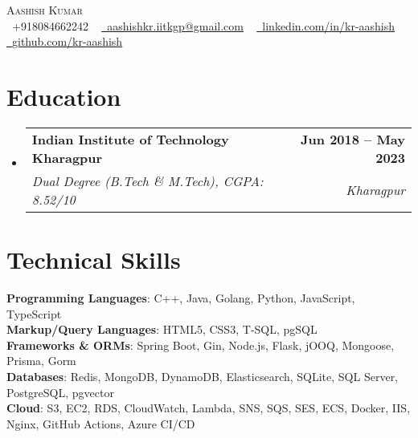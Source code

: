 \documentclass[letterpaper,11pt]{article}
\makeatletter
\newcommand{\resumeSubheading}[4]{
  \vspace{-2pt}\item
    \begin{tabular*}{1.0\textwidth}[t]{l@{\extracolsep{\fill}}r}
      \textbf{#1} & \textbf{\small #2} \\
      \textit{\small#3} & \textit{\small #4} \\
    \end{tabular*}\vspace{-7pt}
}
\newcommand{\resumeSubHeadingListStart}{\begin{itemize}[leftmargin=0.0in, label={}]}
\newcommand{\resumeSubHeadingListEnd}{\end{itemize}}
\makeatother
\begin{document}

\begin{center}
    {\Huge \scshape Aashish Kumar} \\ \vspace{1pt}
    \small \raisebox{-0.1\height}\faPhone\ +918084662242 ~ \href{mailto:aashishkr.iitkgp@gmail.com}{\raisebox{-0.2\height}\faEnvelope\  \underline{aashishkr.iitkgp@gmail.com}} ~ 
    \href{https://www.linkedin.com/in/kr-aashish/}{\raisebox{-0.2\height}\faLinkedin\ \underline{linkedin.com/in/kr-aashish}}  ~
    \href{https://github.com/kr-aashish}{\raisebox{-0.2\height}\faGithub\ \underline{github.com/kr-aashish}}
    \vspace{-8pt}
\end{center}


\section{Education}
  \resumeSubHeadingListStart
    \resumeSubheading
      {Indian Institute of Technology Kharagpur}{Jun 2018 -- May 2023}
      {Dual Degree (B.Tech \& M.Tech), CGPA: 8.52/10}{Kharagpur}
  \resumeSubHeadingListEnd


\section{Technical Skills}
 \begin{itemize}[leftmargin=0.15in, label={}]
    \small{\item{
     \textbf{Programming Languages}{: C++, Java, Golang, Python, JavaScript, TypeScript} \\
     \textbf{Markup/Query Languages}{: HTML5, CSS3, T‐SQL, pgSQL} \\
     \textbf{Frameworks \& ORMs}{: Spring Boot, Gin, Node.js, Flask, jOOQ, Mongoose, Prisma, Gorm} \\
     \textbf{Databases}{: Redis, MongoDB, DynamoDB, Elasticsearch, SQLite, SQL Server, PostgreSQL, pgvector} \\
     \textbf{Cloud}{: S3, EC2, RDS, CloudWatch, Lambda, SNS, SQS, SES, ECS, Docker, IIS, Nginx, GitHub Actions, Azure CI/CD} \\
    }}
 \end{itemize}
 \vspace{-16pt}
\end{document}
